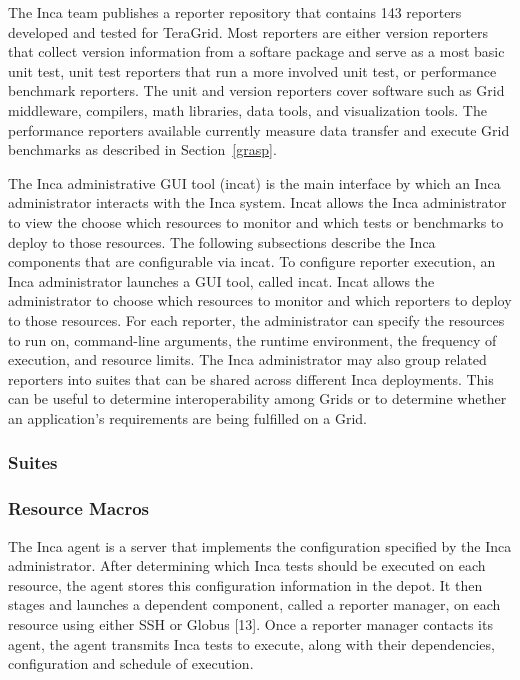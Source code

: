 \documentclass[times,10pt,twocolumn]{article}
\begin{document}
The Inca team publishes a reporter repository that contains 143 reporters
developed and tested for TeraGrid.  Most reporters are either version
reporters that collect version information from a softare package and
serve as a most basic unit test, unit test reporters that run a more involved
unit test, or performance benchmark reporters.  The unit and version
reporters cover software such as Grid middleware, compilers, math libraries,
data tools, and visualization tools.  The performance reporters available
currently measure data transfer and execute Grid benchmarks as described in
Section~\ref{grasp}.


The Inca administrative GUI tool (incat) is the main interface by which an
Inca administrator interacts with the Inca system.  Incat allows the Inca
administrator to view the choose which resources to monitor and which tests or 
benchmarks to deploy to those resources.  The following subsections
describe the Inca components that are configurable via incat.  
To configure reporter execution, an Inca administrator launches a GUI tool,
called incat.  Incat allows the administrator to choose which resources to
monitor and which reporters to deploy to those resources.  For each
reporter, the administrator can specify the resources to run on,
command-line arguments, the runtime environment, the frequency of execution,
and resource limits. The Inca administrator may also group related reporters
into suites that can be shared across different Inca deployments.  This can
be useful to determine interoperability among Grids or to determine whether
an application's requirements are being fulfilled on a Grid.

\subsubsection{Suites}

\subsubsection{Resource Macros}


The Inca agent is a server that implements the configuration specified by the
Inca administrator.  After determining which Inca tests should be executed on
each resource, the agent stores this configuration information in the depot.
It then stages and launches a dependent component, called a reporter manager,
on each resource using either SSH or Globus [13].  Once a reporter manager
contacts its agent, the agent transmits Inca tests to execute, along with
their dependencies, configuration and schedule of execution. 
  
\end{document}
